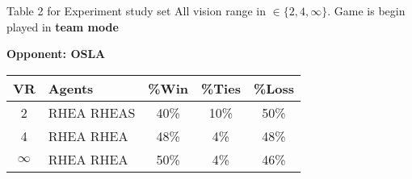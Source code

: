 \documentclass{report}
\begin{document}
     Table 2 for Experiment study set All  vision range in $ \in \{2, 4, \infty\}$. Game is begin played in \textbf{team mode}
     \newline
     \begin{center}
     \textbf{Opponent: OSLA}
     \begin{tabularx}{330pt}{|c|X|c|c|c|}
     	\hline
     	VR & Agents & \%Win & \%Ties & \%Loss\\
     	\hline
     	2 & RHEA RHEAS & 40\% &10\% &50\%\\
     	\hline
     	4 & RHEA RHEA  & 48\% &4\% &48\% \\
     	\hline
     	 $\infty$ &RHEA RHEA & 50\%&4\% &46\% \\
     	\hline
     \end{tabularx}\newline


\end{center}
\end{document}
